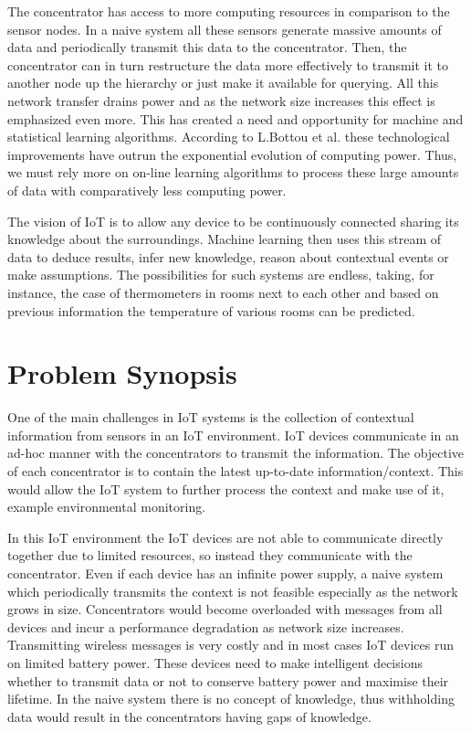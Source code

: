 \documentclass{mproj}
\begin{document}
The concentrator has access to more computing resources in comparison to the sensor nodes. In a naive system all these sensors generate massive amounts of data and periodically transmit this data to the concentrator. Then, the concentrator can in turn restructure the data more effectively to transmit it to another node up the hierarchy or just make it available for querying. All this network transfer drains power and as the network size increases this effect is emphasized even more. This has created a need and opportunity for machine and statistical learning algorithms. \cite{LargeScaleOnlineLearning} According to L.Bottou et al. \cite{LargeScaleOnlineLearning} these technological improvements have outrun the exponential evolution of computing power. Thus, we must rely more on on-line learning algorithms to process these large amounts of data with comparatively less computing power.

The vision of IoT is to allow any device to be continuously connected sharing its knowledge about the surroundings. Machine learning then uses this stream of data to deduce results, infer new knowledge, reason about contextual events or make assumptions. The possibilities for such systems are endless, taking, for instance, the case of thermometers in rooms next to each other and based on previous information the temperature of various rooms can be predicted.

\section{Problem Synopsis}
One of the main challenges in IoT systems is the collection of contextual information from sensors in an IoT environment. \cite{intelligentContextualInformation} IoT devices communicate in an ad-hoc manner with the concentrators to transmit the information. The objective of each concentrator is to contain the latest up-to-date information/context. This would allow the IoT system to further process the context and make use of it, example environmental monitoring.

In this IoT environment the IoT devices are not able to communicate directly together due to limited resources, so instead they communicate with the concentrator. Even if each device has an infinite power supply, a naive system which periodically transmits the context is not feasible especially as the network grows in size. Concentrators would become overloaded with messages from all devices and incur a performance degradation as network size increases. Transmitting wireless messages is very costly and in most cases IoT devices run on limited battery power. These devices need to make intelligent decisions whether to transmit data or not to conserve battery power and maximise their lifetime. In the naive system there is no concept of knowledge, thus withholding data would result in the concentrators having gaps of knowledge.
\end{document}
